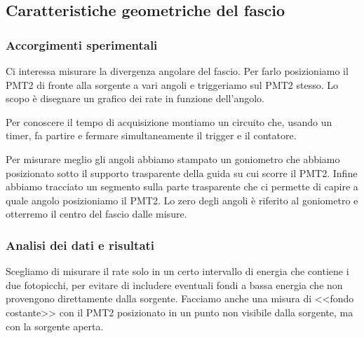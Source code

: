 \subsection{Caratteristiche geometriche del fascio}

\subsubsection{Accorgimenti sperimentali}

Ci interessa misurare la divergenza angolare del fascio.
Per farlo posizioniamo il PMT2 di fronte alla sorgente a vari angoli e triggeriamo sul PMT2 stesso. Lo scopo è disegnare un grafico dei rate in funzione dell'angolo.

Per conoscere il tempo di acquisizione montiamo un circuito che, usando un timer,
fa partire e fermare simultaneamente il trigger e il contatore.

Per misurare meglio gli angoli abbiamo stampato un goniometro che abbiamo posizionato sotto il supporto trasparente della guida su cui scorre il PMT2. Infine abbiamo tracciato un segmento sulla parte trasparente che ci permette di capire a quale angolo posizioniamo il PMT2.
Lo zero degli angoli è riferito al goniometro e otterremo il centro del fascio dalle misure.

\subsubsection{Analisi dei dati e risultati}

Scegliamo di misurare il rate solo in un certo intervallo di energia che contiene i due fotopicchi,
per evitare di includere eventuali fondi a bassa energia che non provengono direttamente dalla sorgente.
Facciamo anche una misura di <<fondo costante>> con il PMT2 posizionato in un punto non visibile dalla sorgente,
ma con la sorgente aperta.

